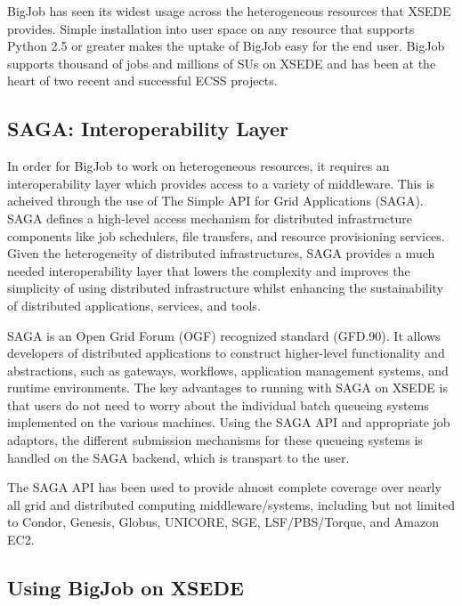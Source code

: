 \documentclass{sig-alternate}
\begin{document}
BigJob has seen its widest usage across the heterogeneous resources
that XSEDE provides. Simple installation into user space on any
resource that supports Python 2.5 or greater makes the uptake of
BigJob easy for the end user. BigJob supports thousand of jobs and
millions of SUs on XSEDE and has been at the heart of two recent and
successful ECSS projects.


\subsection{SAGA: Interoperability Layer}

In order for BigJob to work on heterogeneous resources, it requires an
interoperability layer which provides access to a variety of
middleware.  This is acheived through the use of The Simple API for Grid Applications (SAGA).
SAGA defines a 
high-level access mechanism for distributed infrastructure components 
like job schedulers, file transfers, and resource provisioning services. 
Given the heterogeneity of distributed infrastructures, SAGA provides 
a much needed interoperability layer that lowers the complexity and 
improves the simplicity of using distributed infrastructure whilst 
enhancing the sustainability of distributed applications, services, and tools.

SAGA is an Open Grid Forum (OGF) recognized standard (GFD.90). 
It allows developers of distributed applications to construct
higher-level functionality and abstractions, such as
gateways, workflows, application management systems, and runtime
environments. The key advantages to running with SAGA on XSEDE
is that users do not need to worry about the individual batch
queueing systems implemented on the various machines. Using the 
SAGA API and appropriate job adaptors, the different submission
mechanisms for these queueing systems is handled on the SAGA backend,
which is transpart to the user.

The SAGA API has been used to provide almost complete
coverage over nearly all grid and distributed computing
middleware/systems, including but not limited to Condor, Genesis,
Globus, UNICORE, SGE, LSF/PBS/Torque, and Amazon EC2.

\subsection{Using BigJob on XSEDE}
\end{document}
